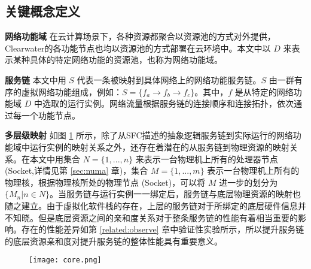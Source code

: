 \subsection{关键概念定义}
\textbf{网络功能域}{ }在云计算场景下，各种资源都聚合以资源池的方式对外提供，Clearwater的各功能节点也均以资源池的方式部署在云环境中。本文中以 $D$ 来表示某种具体的特定网络功能的资源池，也称为网络功能域。

\textbf{服务链}{ }本文中用 $S$ 代表一条被映射到具体网络上的网络功能服务链。$S$ 由一群有序的虚拟网络功能组成，例如：$S = \{f_{a} \to f_{b} \to f_{c}\}$。其中，$f$ 是从特定的网络功能域 $D$ 中选取的运行实例。网络流量根据服务链的连接顺序和连接拓扑，依次通过每一个功能节点。

\textbf{多层级映射}{ }如图 \ref{fig:mapping} 所示，除了从SFC描述的抽象逻辑服务链到实际运行的网络功能域中运行实例的映射关系之外，还存在着潜在的从服务链到物理资源的映射关系。在本文中用集合 $N = \{1,...,n\}$ 来表示一台物理机上所有的处理器节点 (Socket,详情见第 \ref{sec:numa} 章)，集合 $M = \{1,...,m\}$ 表示一台物理机上所有的物理核，根据物理核所处的物理节点 (Socket)，可以将 $M$ 进一步的划分为 $\{M_{n}| n \in N\}$。当服务链与运行实例一一绑定后，服务链与底层物理资源的映射也随之建立。由于虚拟化软件栈的存在，上层的服务链对于所绑定的底层硬件信息并不知晓。但是底层资源之间的亲和度关系对于整条服务链的性能有着相当重要的影响。存在的性能差异如第 \ref{related:observe} 章中验证性实验所示，所以提升服务链的底层资源亲和度对提升服务链的整体性能具有重要意义。

\begin{figure}[!htp]
	\label{fig:mapping}
	\centering
	\texttt{[image: core.png]}
\end{figure}

